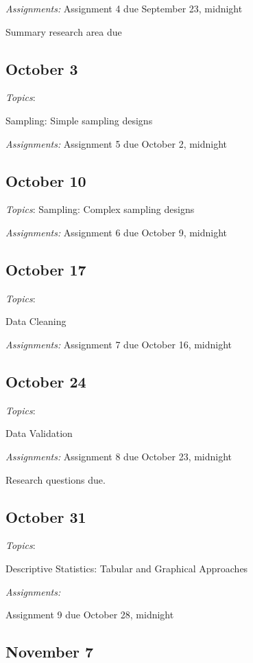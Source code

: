 \documentclass[12pt]{article}
\begin{document}
\begin{flushleft}
\textit {Assignments:}
Assignment 4 due September 23, midnight

Summary research area due

\subsection{October 3}


\textit{Topics}:

Sampling: Simple sampling designs

\textit {Assignments:}
Assignment 5 due October 2, midnight
\subsection{October 10}


\textit{Topics}:
Sampling: Complex sampling designs


\textit {Assignments:}
Assignment 6 due October 9, midnight
\subsection{October 17}


\textit{Topics}:

Data Cleaning

\textit {Assignments:}
Assignment 7 due October 16, midnight

\subsection{October 24}


\textit{Topics}:

Data Validation

\textit {Assignments:}
Assignment 8 due October 23, midnight

Research questions due. 

\subsection{October 31}


\textit{Topics}:

Descriptive Statistics: Tabular and Graphical Approaches

\textit {Assignments:}

Assignment 9 due October 28, midnight

\subsection{November 7}



\end{flushleft}
\end{document}

